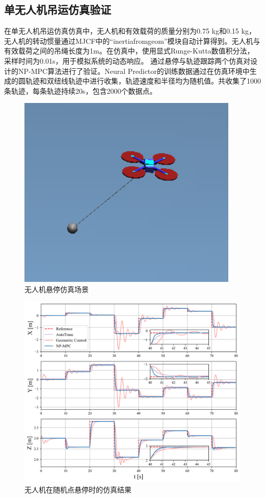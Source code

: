 \documentclass[lang=chs, degree=master, blindreview=true, winfonts=true]{yanputhesis}
\begin{document}
\subsection{单无人机吊运仿真验证}


在单无人机吊运仿真仿真中，无人机和有效载荷的质量分别为0.75 kg和0.15 kg，无人机的转动惯量通过MJCF中的“inertiafromgeom”模块自动计算得到。无人机与有效载荷之间的吊绳长度为1m。在仿真中，使用显式Runge-Kutta数值积分法，采样时间为0.01s，用于模拟系统的动态响应。
通过悬停与轨迹跟踪两个仿真对设计的NP-MPC算法进行了验证。Neural Predictor的训练数据通过在仿真环境中生成的圆轨迹和双纽线轨迹中进行收集，轨迹速度和半径均为随机值。共收集了1000条轨迹，每条轨迹持续20s，包含2000个数据点。
\begin{figure}[hbt!]
	\centering
	\includegraphics[width=25pc]{picture/kk/xuanting.png} 
	\caption{无人机悬停仿真场景} 
	\label{xuanting}
\end{figure}

\begin{figure}[hbt!]
	\centering
	\includegraphics[width=33pc]{picture/kk/comparision.png} 
	\vspace{-0.2cm}
	\caption{无人机在随机点悬停时的仿真结果} 
	\label{comparision}
\end{figure}
\end{document}
